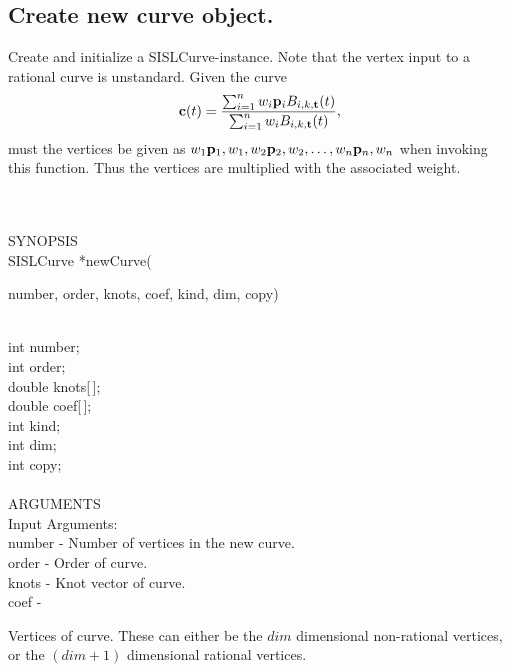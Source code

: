 \subsection{Create new curve object.} \label{sec:newCurve}
\begin{minipg1}
  Create and initialize a SISLCurve-instance. Note that the vertex input to a
  rational curve is unstandard. Given the curve
  $$
{\bf c}(t) = {\sum_{i=1}^{n} w_i {\bf p}_{i} B_{i,k,{\bf t}}(t)
                 \over
                 \sum_{i=1}^{n} w_i B_{i,k,{\bf t}}(t)},
$$
must the vertices be given as
${w_1  {\bf p}_1, w_1, w_2  {\bf p}_2, w_2, \ldots,
  w_n  {\bf p}_n, w_n}$ when invoking this function. Thus the vertices are multiplied with the
associated weight.
\end{minipg1} \\ \\
SYNOPSIS\\
        \>SISLCurve *newCurve(\begin{minipg3}
        {\fov number}, {\fov order}, {\fov knots}, {\fov coef}, {\fov kind}, {\fov dim}, {\fov copy})
                \end{minipg3}\\[0.3ex]
                \>\>    int    \>       {\fov number};\\
                \>\>    int    \>       {\fov order};\\
                \>\>    double \>       {\fov knots}[\,];\\
                \>\>    double \>       {\fov coef}[\,];\\
                \>\>    int    \>       {\fov kind};\\
                \>\>    int    \>       {\fov dim};\\
                \>\>    int    \>       {\fov copy};\\
\\
ARGUMENTS\\
        \>Input Arguments:\\
        \>\>    {\fov number}   \> - \> Number of vertices in the new curve.\\
        \>\>    {\fov order} \> - \> Order of curve.\\
        \>\>    {\fov knots} \> - \> Knot vector of curve.\\
        \>\>    {\fov coef}  \> - \> \begin{minipg2}
                      Vertices of curve. These can either be the $dim$
                      \mbox{dimensional}
                      non-rational vertices, or the $(dim+1)$ dimensional rational
                      vertices.
                                     \end{minipg2}\\[0.8ex]
